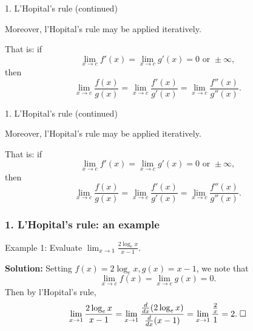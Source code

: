 \documentclass{beamer}
\begin{document}
\begin{frame}{1. L'Hopital's rule (continued)}

Moreover, l'Hopital's rule may be applied iteratively.

	\begin{block}{That is:}
if	
\[
\lim_{x\rightarrow c} f'(x) = \lim_{x\rightarrow c} g'(x) = 0 \text{ or } \pm \infty ,
\]
then
\[
\lim_{x\rightarrow c} \frac{f(x)}{g(x)} = \lim_{x\rightarrow c} \frac{f'(x)}{g'(x)} = \lim_{x\rightarrow c} \frac{f''(x)}{g''(x)}.
\]
	
	\end{block}	

\end{frame}


\begin{frame}{1. L'Hopital's rule (continued)}

Moreover, l'Hopital's rule may be applied iteratively.

	\begin{block}{That is:}
if	
\[
\lim_{x\rightarrow c} f'(x) = \lim_{x\rightarrow c} g'(x) = 0 \text{ or } \pm \infty ,
\]
then
\[
\lim_{x\rightarrow c} \frac{f(x)}{g(x)} = \lim_{x\rightarrow c} \frac{f'(x)}{g'(x)} = \lim_{x\rightarrow c} \frac{f''(x)}{g''(x)}.
\]
	
	\end{block}	

\end{frame}


\begin{frame}
\frametitle{1. L'Hopital's rule: an example}
			
			\begin{block}{Example 1:}
			Evaluate $\displaystyle{ \lim_{x\rightarrow 1} \frac{ 2\log_e x }{x-1}}$.
			\end{block}

{\bf Solution:} Setting $f(x) = 2 \log_e x, g(x) = x-1$, we note that 
\[
\lim_{x\rightarrow c} f(x) = \lim_{x\rightarrow c} g(x) = 0.
\]
Then by l'Hopital's rule,
\[
\lim_{x\rightarrow 1} \frac{2 \log_e x}{x-1} = \lim_{x\rightarrow 1} \frac{ \frac{d}{dx} (2 \log_e x)}{ \frac{d}{dx} (x-1)} = \lim_{x\rightarrow 1} \frac{\frac{2}{x}}{1} = 2. \thickspace \Box
\]

\end{frame}


\end{document}
